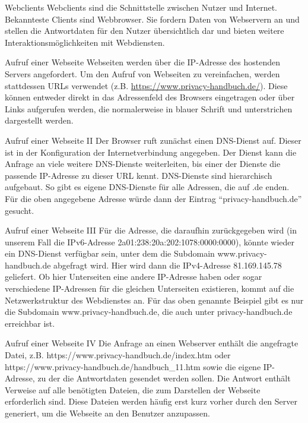 \documentclass[utf8]{beamer}
\begin{document}
	\begin{frame}{Webclients}
		Webclients sind die Schnittstelle zwischen Nutzer und Internet. Bekannteste Clients sind Webbrowser. Sie fordern Daten von Webservern an und stellen die Antwortdaten für den Nutzer übersichtlich dar und bieten weitere Interaktionsmöglichkeiten mit Webdiensten.
	\end{frame}
	
	\begin{frame}{Aufruf einer Webseite}
		Webseiten werden über die IP-Adresse des hostenden Servers angefordert. Um den Aufruf von Webseiten zu vereinfachen, werden stattdessen URLs verwendet (z.B. \url{https://www.privacy-handbuch.de/}). Diese können entweder direkt in das Adressenfeld des Browsers eingetragen oder über Links aufgerufen werden, die normalerweise in blauer Schrift und unterstrichen dargestellt werden.
	\end{frame}

	\begin{frame}{Aufruf einer Webseite II}
		Der Browser ruft zunächst einen DNS-Dienst auf. Dieser ist in der Konfiguration der Internetverbindung angegeben. Der Dienst kann die Anfrage an viele weitere DNS-Dienste weiterleiten, bis einer der Dienste die passende IP-Adresse zu dieser URL kennt.
		DNS-Dienste sind hierarchisch aufgebaut. So gibt es eigene DNS-Dienste für alle Adressen, die auf .de enden. Für die oben angegebene Adresse würde dann der Eintrag \enquote{privacy-handbuch.de} gesucht.
	\end{frame}

	\begin{frame}{Aufruf einer Webseite III}
		Für die Adresse, die daraufhin zurückgegeben wird  (in unserem Fall die IPv6-Adresse 2a01:238:20a:202:1078:0000:0000), könnte wieder ein DNS-Dienst verfügbar sein, unter dem die Subdomain www.privacy-handbuch.de abgefragt wird. Hier wird dann die IPv4-Adresse 81.169.145.78 geliefert. Ob hier Unterseiten eine andere IP-Adresse haben oder sogar verschiedene IP-Adressen für die gleichen Unterseiten existieren, kommt auf die Netzwerkstruktur des Webdienstes an. Für das oben genannte Beispiel gibt es nur die Subdomain www.privacy-handbuch.de, die auch unter privacy-handbuch.de erreichbar ist.
	\end{frame}

	\begin{frame}{Aufruf einer Webseite IV}
		Die Anfrage an einen Webserver enthält die angefragte Datei, z.B. https://www.privacy-handbuch.de/index.htm oder https://www.privacy-handbuch.de/handbuch\_11.htm sowie die eigene IP-Adresse, zu der die Antwortdaten gesendet werden sollen.
		Die Antwort enthält Verweise auf alle benötigten Dateien, die zum Darstellen der Webseite erforderlich sind. Diese Dateien werden häufig erst kurz vorher durch den Server generiert, um die Webseite an den Benutzer anzupassen.
	\end{frame}
\end{document}
